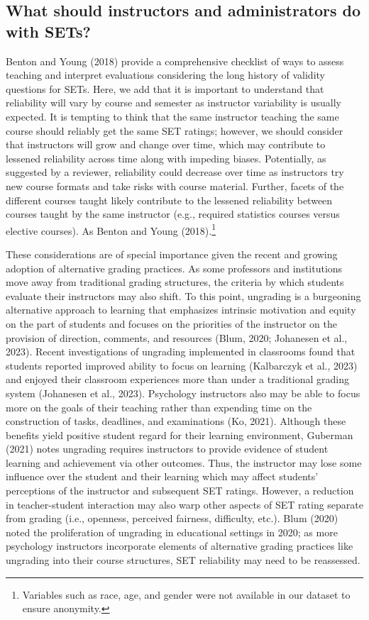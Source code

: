 \documentclass[
  man]{apa7}
\begin{document}
\subsection{What should instructors and administrators do with SETs?}\label{what-should-instructors-and-administrators-do-with-sets}

Benton and Young (2018) provide a comprehensive checklist of ways to assess teaching and interpret evaluations considering the long history of validity questions for SETs. Here, we add that it is important to understand that reliability will vary by course and semester as instructor variability is usually expected. It is tempting to think that the same instructor teaching the same course should reliably get the same SET ratings; however, we should consider that instructors will grow and change over time, which may contribute to lessened reliability across time along with impeding biases. Potentially, as suggested by a reviewer, reliability could decrease over time as instructors try new course formats and take risks with course material. Further, facets of the different courses taught likely contribute to the lessened reliability between courses taught by the same instructor (e.g., required statistics courses versus elective courses). As Benton and Young (2018).\footnote{Variables such as race, age, and gender were not available in our
  dataset to ensure anonymity.}

These considerations are of special importance given the recent and
growing adoption of alternative grading practices. As some professors
and institutions move away from traditional grading structures, the
criteria by which students evaluate their instructors may
also shift. To this point, ungrading is a burgeoning alternative
approach to learning that emphasizes intrinsic motivation and equity on
the part of students and focuses on the priorities of the instructor on
the provision of direction, comments, and resources (Blum, 2020; Johanesen et al., 2023). Recent investigations of ungrading implemented in
classrooms found that students reported improved ability to focus on
learning (Kalbarczyk et al., 2023) and enjoyed their classroom experiences more
than under a traditional grading system (Johanesen et al., 2023). Psychology
instructors also may be able to focus more on the goals of their
teaching rather than expending time on the construction of tasks,
deadlines, and examinations (Ko, 2021). Although these benefits yield
positive student regard for their learning environment, Guberman (2021)
notes ungrading requires instructors to provide evidence of student
learning and achievement via other outcomes. Thus, the instructor may
lose some influence over the student and their learning which may affect
students' perceptions of the instructor and subsequent SET ratings.
However, a reduction in teacher-student interaction may also warp other
aspects of SET rating separate from grading (i.e., openness, perceived
fairness, difficulty, etc.). Blum (2020) noted the proliferation of
ungrading in educational settings in 2020; as more psychology
instructors incorporate elements of alternative grading practices like
ungrading into their course structures, SET reliability may need to be
reassessed.
\end{document}
